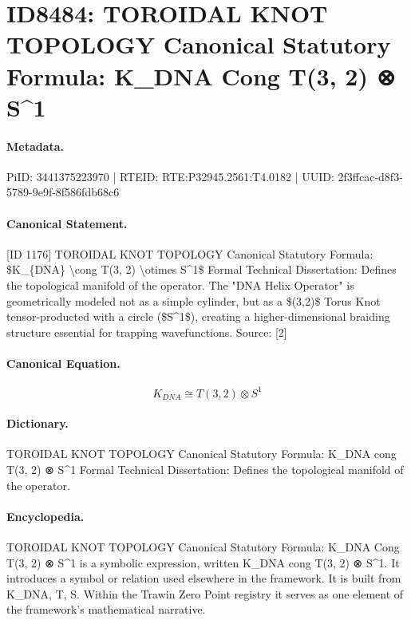 \section*{ID8484: TOROIDAL KNOT TOPOLOGY Canonical Statutory Formula: K\_DNA Cong T(3, 2) ⊗ S\textasciicircum{}1}
\paragraph{Metadata.}
PiID: 3441375223970 | RTEID: RTE:P32945.2561:T4.0182 | UUID: 2f3ffcac-d8f3-5789-9e9f-8f586fdb68c6

\paragraph{Canonical Statement.}
[ID 1176] TOROIDAL KNOT TOPOLOGY Canonical Statutory Formula: \$K\_\{DNA\} \textbackslash{}cong T(3, 2) \textbackslash{}otimes S\textasciicircum{}1\$ Formal Technical Dissertation: Defines the topological manifold of the operator. The "DNA Helix Operator" is geometrically modeled not as a simple cylinder, but as a \$(3,2)\$ Torus Knot tensor-producted with a circle (\$S\textasciicircum{}1\$), creating a higher-dimensional braiding structure essential for trapping wavefunctions. Source: [2]

\paragraph{Canonical Equation.}
\[
K_{DNA} \cong T(3, 2) \otimes S^1
\]

\paragraph{Dictionary.}
TOROIDAL KNOT TOPOLOGY Canonical Statutory Formula: K\_DNA cong T(3, 2) ⊗ S\textasciicircum{}1 Formal Technical Dissertation: Defines the topological manifold of the operator.

\paragraph{Encyclopedia.}
TOROIDAL KNOT TOPOLOGY Canonical Statutory Formula: K\_DNA Cong T(3, 2) ⊗ S\textasciicircum{}1 is a symbolic expression, written K\_DNA cong T(3, 2) ⊗ S\textasciicircum{}1. It introduces a symbol or relation used elsewhere in the framework. It is built from K\_DNA, T, S. Within the Trawin Zero Point registry it serves as one element of the framework's mathematical narrative.
